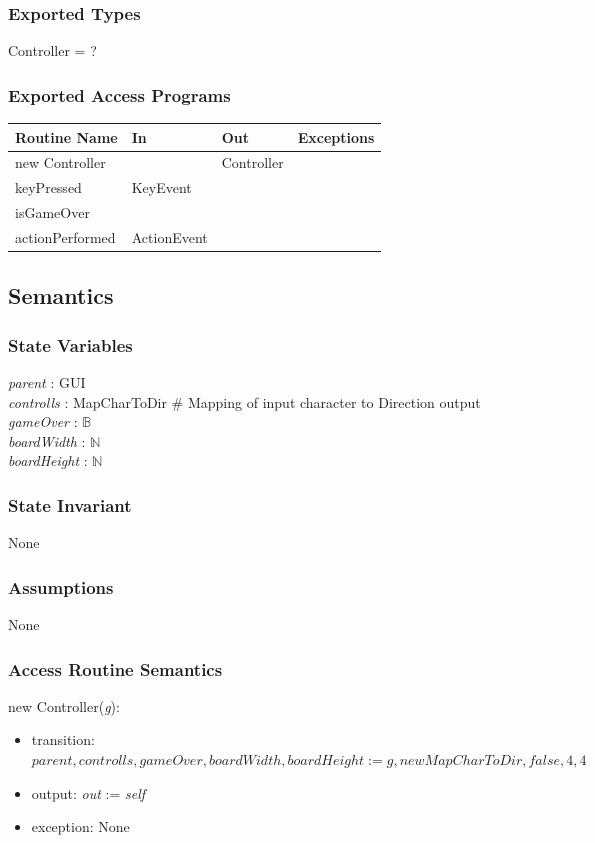 \documentclass{article}
\begin{document}
		\subsubsection*{Exported Types}
			Controller = ?

		\subsubsection*{Exported Access Programs}
			\begin{tabular}{|l|l|l|p{5cm}|}
				\hline
				\textbf{Routine Name} & \textbf{In} & \textbf{Out} & \textbf{Exceptions} \\
				\hline
				new Controller & & Controller & \\
				\hline
				keyPressed & KeyEvent & & \\
				\hline
				isGameOver & & & \\
				\hline
				actionPerformed & ActionEvent & & \\
				\hline
			\end{tabular}

	\subsection*{Semantics}

		\subsubsection*{State Variables}
			\textit{parent} : GUI\\
			\textit{controlls} : MapCharToDir \# Mapping of input character to Direction output\\
			\textit{gameOver} : $\mathbb{B}$\\
			\textit{boardWidth} : $\mathbb{N}$\\
			\textit{boardHeight} : $\mathbb{N}$

		\subsubsection*{State Invariant}
			None

		\subsubsection*{Assumptions}
			None

		\subsubsection*{Access Routine Semantics}
			\noindent new Controller(\textit{g}):
			\begin{itemize}
				\item transition: $parent, controlls, gameOver, boardWidth, boardHeight := g, new MapCharToDir, false, 4, 4$
				\item output: \textit{out} := \textit{self}
				\item exception: None
			\end{itemize}
\end{document}
